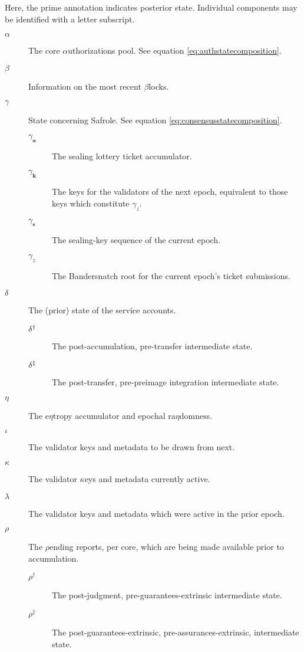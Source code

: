 Here, the prime annotation indicates posterior state. Individual components may be identified with a letter subscript.
\begin{description}
  \item[$\alpha$] The core $\alpha$uthorizations pool. See equation \ref{eq:authstatecomposition}. %
  \item[$\beta$] Information on the most recent $\beta$locks. %
  \item[$\gamma$] State concerning Safrole. See equation \ref{eq:consensusstatecomposition}. %
  \begin{description}
    \item[$\gamma_\mathbf{a}$] The sealing lottery ticket accumulator.
    \item[$\gamma_\mathbf{k}$] The keys for the validators of the next epoch, equivalent to those keys which constitute $\gamma_z$.
    \item[$\gamma_\mathbf{s}$] The sealing-key sequence of the current epoch.
    \item[$\gamma_z$] The Bandersnatch root for the current epoch's ticket submissions.
  \end{description}
  \item[$\delta$] The (prior) state of the service accounts. %
  \begin{description}
    \item[$\delta^\dagger$] The post-accumulation, pre-transfer intermediate state. %
    \item[$\delta^\ddagger$] The post-transfer, pre-preimage integration intermediate state. %
  \end{description}
  \item[$\eta$] The e$\eta$tropy accumulator and epochal ra$\eta$domness. %
  \item[$\iota$] The validator keys and metadata to be drawn from next. %
  \item[$\kappa$] The validator $\kappa$eys and metadata currently active. %
  \item[$\lambda$] The validator keys and metadata which were active in the prior epoch. %
  \item[$\rho$] The $\rho$ending reports, per core, which are being made available prior to accumulation. %
  \begin{description}
    \item[$\rho^\dagger$] The post-judgment, pre-guarantees-extrinsic intermediate state. %
    \item[$\rho^\ddagger$] The post-guarantees-extrinsic, pre-assurances-extrinsic, intermediate state. %

\end{description}
\end{description}
